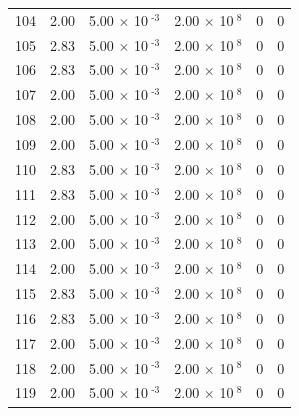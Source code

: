 \documentclass[a4paper,11pt]{article}
\begin{document}
\begin{center}
\begin{longtable}{|R{1.5cm}|R{2.4cm}|R{2.4cm}|R{2.4cm}|R{2.4cm}|R{2.4cm}|}
  104 &   2.00  &         5.00 $\times$ 10$^{\text{          -3}}$  &         2.00 $\times$ 10$^{\text{           8}}$  & 0  & 0 \\
  105 &   2.83  &         5.00 $\times$ 10$^{\text{          -3}}$  &         2.00 $\times$ 10$^{\text{           8}}$  & 0  & 0 \\
  106 &   2.83  &         5.00 $\times$ 10$^{\text{          -3}}$  &         2.00 $\times$ 10$^{\text{           8}}$  & 0  & 0 \\
  107 &   2.00  &         5.00 $\times$ 10$^{\text{          -3}}$  &         2.00 $\times$ 10$^{\text{           8}}$  & 0  & 0 \\
  108 &   2.00  &         5.00 $\times$ 10$^{\text{          -3}}$  &         2.00 $\times$ 10$^{\text{           8}}$  & 0  & 0 \\
  109 &   2.00  &         5.00 $\times$ 10$^{\text{          -3}}$  &         2.00 $\times$ 10$^{\text{           8}}$  & 0  & 0 \\
  110 &   2.83  &         5.00 $\times$ 10$^{\text{          -3}}$  &         2.00 $\times$ 10$^{\text{           8}}$  & 0  & 0 \\
  111 &   2.83  &         5.00 $\times$ 10$^{\text{          -3}}$  &         2.00 $\times$ 10$^{\text{           8}}$  & 0  & 0 \\
  112 &   2.00  &         5.00 $\times$ 10$^{\text{          -3}}$  &         2.00 $\times$ 10$^{\text{           8}}$  & 0  & 0 \\
  113 &   2.00  &         5.00 $\times$ 10$^{\text{          -3}}$  &         2.00 $\times$ 10$^{\text{           8}}$  & 0  & 0 \\
  114 &   2.00  &         5.00 $\times$ 10$^{\text{          -3}}$  &         2.00 $\times$ 10$^{\text{           8}}$  & 0  & 0 \\
  115 &   2.83  &         5.00 $\times$ 10$^{\text{          -3}}$  &         2.00 $\times$ 10$^{\text{           8}}$  & 0  & 0 \\
  116 &   2.83  &         5.00 $\times$ 10$^{\text{          -3}}$  &         2.00 $\times$ 10$^{\text{           8}}$  & 0  & 0 \\
  117 &   2.00  &         5.00 $\times$ 10$^{\text{          -3}}$  &         2.00 $\times$ 10$^{\text{           8}}$  & 0  & 0 \\
  118 &   2.00  &         5.00 $\times$ 10$^{\text{          -3}}$  &         2.00 $\times$ 10$^{\text{           8}}$  & 0  & 0 \\
  119 &   2.00  &         5.00 $\times$ 10$^{\text{          -3}}$  &         2.00 $\times$ 10$^{\text{           8}}$  & 0  & 0 \\

\end{longtable}
\end{center}
\end{document}
